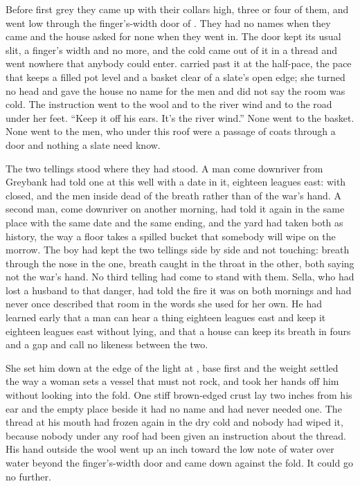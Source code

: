
Before first grey they came up  with their collars high, three or four of them, and went low through the finger's-width door of . They had no names when they came and the house asked for none when they went in. The door kept its usual slit, a finger's width and no more, and the cold came out of it in a thread and went nowhere that anybody could enter.  carried  past it at the half-pace, the pace that keeps a filled pot level and a basket clear of a slate's open edge; she turned no head and gave the house no name for the men and did not say the room was cold. The instruction went to the wool and to the river wind and to the road under her feet. “Keep it off his ears. It's the river wind.” None went to the basket. None went to the men, who under this roof were a passage of coats through a door and nothing a slate need know.

The two tellings stood where they had stood. A man come downriver from Greybank had told one at this well with a date in it, eighteen leagues east:  with  closed, and the men inside dead of the breath rather than of the war's hand. A second man, come downriver on another morning, had told it again in the same place with the same date and the same ending, and the yard had taken both as history, the way a floor takes a spilled bucket that somebody will wipe on the morrow. The boy had kept the two tellings side by side and not touching: breath through the nose in the one, breath caught in the throat in the other, both saying not the war's hand. No third telling had come to stand with them. Sella, who had lost a husband to that danger, had told the fire it was  on both mornings and had never once described that room in the words she used for her own. He had learned early that a man can hear a thing eighteen leagues east and keep it eighteen leagues east without lying, and that a house can keep its breath in fours and a gap and call no likeness between the two.

She set him down at the edge of the light at , base first and the weight settled the way a woman sets a vessel that must not rock, and took her hands off him without looking into the fold. One stiff brown-edged crust lay two inches from his ear and the empty place beside it had no name and had never needed one. The thread at his mouth had frozen again in the dry cold and nobody had wiped it, because nobody under any roof had been given an instruction about the thread. His hand outside the wool went up an inch toward the low note of water over water beyond the finger's-width door and came down against the fold. It could go no further.

